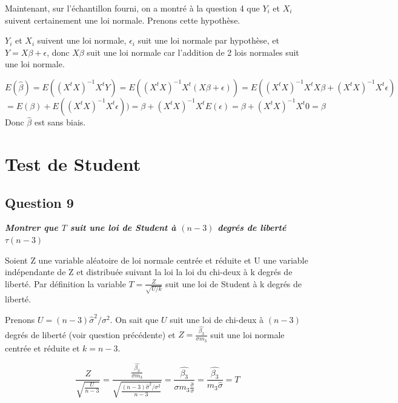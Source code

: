 \documentclass[pdflatex]{article}
\theoremstyle{definition}
\newcommand{\quest}[1]{\textbf{\textit{#1}} \vspace{3mm}}
\begin{document}
Maintenant, sur l'\'echantillon fourni, on a montr\'e \`a la question 4 que $Y_i$ et $X_i$ suivent certainement une loi normale. Prenons cette hypoth\`ese.

$Y_i$ et $X_i$ suivent une loi normale, $\epsilon_i$ suit une loi normale par hypoth\`ese, et $Y = X\beta + \epsilon$, donc $X\beta$ suit une loi normale car l'addition de 2 lois normales suit une loi normale.





$$E(\hat{\beta}) = E((X^tX)^{-1}X^tY) = E((X^tX)^{-1}X^t(X\beta + \epsilon)) = E((X^tX)^{-1}X^tX\beta+ (X^tX)^{-1}X^t\epsilon)
$$
$$
= E(\beta)+ E((X^tX)^{-1}X^t\epsilon)) = \beta + (X^tX)^{-1}X^tE(\epsilon) = \beta + (X^tX)^{-1}X^t0 = \beta
$$
Donc $\hat{\beta}$ est sans biais.

\section*{Test de Student}

\subsection*{Question 9}
\quest{Montrer que $T$ suit une loi de Student \`a $(n - 3)$ degr\'es de libert\'e $\tau (n - 3)$}

Soient Z une variable al\'eatoire de loi normale centr\'ee et r\'eduite et U une variable ind\'ependante de Z et distribu\'ee suivant la loi la loi du chi-deux \`a k degr\'es de libert\'e. Par d\'efinition la variable $T=\frac {Z}{\sqrt {U/k}}$ suit une loi de Student \`a k degr\'es de libert\'e.

Prenons $U = (n-3)\hat{\sigma}^2/\sigma^2$. On sait que $U$ suit une loi de chi-deux \`a $(n-3)$ degr\'es de libert\'e (voir question pr\'ec\'edente) et $Z = \frac{\hat{\beta_3}}{\sigma m_3}$ suit une loi normale centr\'ee et r\'eduite et $k = n-3$.

$$
\frac{Z}{\sqrt{\frac{U}{n-3}}} = \frac{\frac{\hat{\beta_3}}{\sigma m_3}}{\sqrt{\frac{(n-3)\hat{\sigma}^2/\sigma^2}{n-3}}}
= \frac{\hat{\beta_3}}{\sigma m_3 \frac{\hat{\sigma}}{\sigma}} 
= \frac{\hat{\beta_3}}{m_3 \hat{\sigma}} = T
$$
\end{document}
